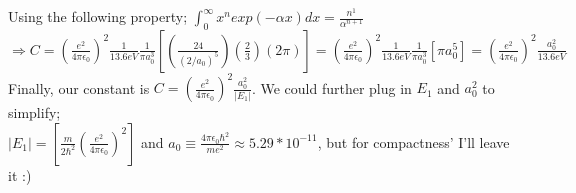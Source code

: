 \documentclass[12pt]{article}
\begin{document}
Using the following property;
${\displaystyle\int_0^\infty}x^nexp(-\alpha x)dx=\frac{n^1}{\alpha^{n+1}}$\\

$\Rightarrow C=(\frac{e^2}{4\pi\epsilon_0})^2\frac{1}{13.6eV}\frac{1}{\pi a_0^3}[(\frac{24}{(2/a_0)^5})(\frac{2}{3})(2\pi)]=(\frac{e^2}{4\pi\epsilon_0})^2\frac{1}{13.6eV}\frac{1}{\pi a_0^3}[\pi a_0^5]=(\frac{e^2}{4\pi\epsilon_0})^2\frac{a_0^2}{13.6eV}$\\

Finally, our constant is $C=(\frac{e^2}{4\pi\epsilon_0})^2\frac{a_0^2}{|E_1|}$. We could further plug in $E_1$ and $a_0^2$ to simplify;\\

$|E_1|=[\frac{m}{2\hbar^2}(\frac{e^2}{4\pi\epsilon_0})^2]$ and $a_0\equiv\frac{4\pi\epsilon_0\hbar^2}{me^2}\approx5.29*10^{-11}$, but for compactness' I'll leave it :)
\end{document}
